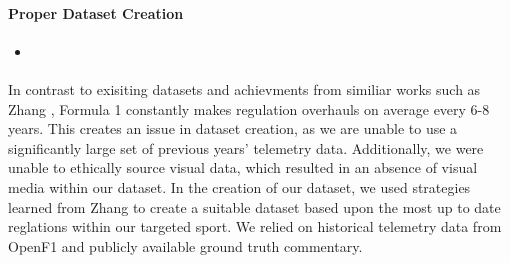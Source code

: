 \paragraph{Proper Dataset Creation}
\begin{itemize}
    \item \cite{AutoBaskData}
\end{itemize}
In contrast to exisiting datasets and achievments from similiar works such as Zhang \cite{AutoBaskData}, Formula 1 constantly makes regulation overhauls on average every 6-8 years. This creates an issue in dataset creation, as we are unable to use a significantly large set of previous years' telemetry data. Additionally, we were unable to ethically source visual data, which resulted in an absence of visual media within our dataset. In the creation of our dataset, we used strategies learned from Zhang to create a suitable dataset based upon the most up to date reglations within our targeted sport. We relied on historical telemetry data from OpenF1 and publicly available ground truth commentary.